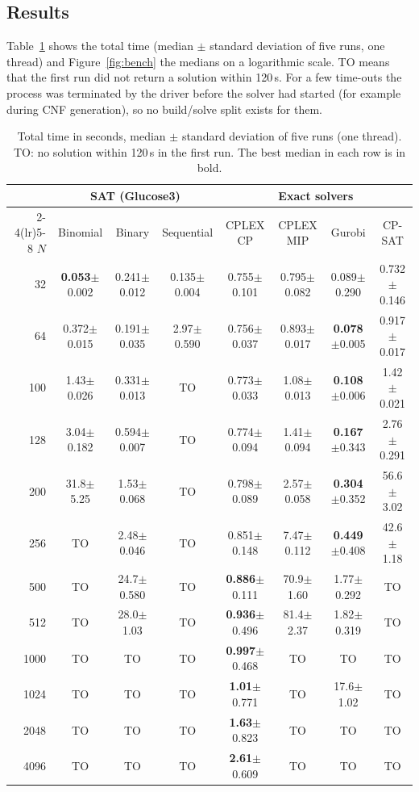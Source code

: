 \documentclass[a4paper,fleqn]{cas-sc}
\begin{document}
\subsection{Results}
Table~\ref{tab:results} shows the total time (median $\pm$ standard deviation of five runs, one thread) and Figure~\ref{fig:bench} the medians on a logarithmic scale.
\textsc{TO} means that the first run did not return a solution within 120\,s.
For a few time-outs the process was terminated by the driver before the solver had started (for example during CNF generation), so no build/solve split exists for them.

\begin{table}[htbp]
\centering
\caption{Total time in seconds, median $\pm$ standard deviation of five runs (one thread). \textsc{TO}: no solution within 120\,s in the first run. The best median in each row is in bold.}\label{tab:results}
\footnotesize
\setlength{\tabcolsep}{3.2pt}
\begin{tabular}{r ccc cccc}
\toprule
 & \multicolumn{3}{c}{SAT (Glucose3)} & \multicolumn{4}{c}{Exact solvers}\\
\cmidrule(lr){2-4}\cmidrule(lr){5-8}
$N$ & Binomial & Binary & Sequential & CPLEX CP & CPLEX MIP & Gurobi & CP-SAT\\
\midrule
32 & \textbf{0.053}$\pm$0.002 & 0.241$\pm$0.012 & 0.135$\pm$0.004 & 0.755$\pm$0.101 & 0.795$\pm$0.082 & 0.089$\pm$0.290 & 0.732$\pm$0.146\\
64 & 0.372$\pm$0.015 & 0.191$\pm$0.035 & 2.97$\pm$0.590 & 0.756$\pm$0.037 & 0.893$\pm$0.017 & \textbf{0.078}$\pm$0.005 & 0.917$\pm$0.017\\
100 & 1.43$\pm$0.026 & 0.331$\pm$0.013 & TO & 0.773$\pm$0.033 & 1.08$\pm$0.013 & \textbf{0.108}$\pm$0.006 & 1.42$\pm$0.021\\
128 & 3.04$\pm$0.182 & 0.594$\pm$0.007 & TO & 0.774$\pm$0.094 & 1.41$\pm$0.094 & \textbf{0.167}$\pm$0.343 & 2.76$\pm$0.291\\
200 & 31.8$\pm$5.25 & 1.53$\pm$0.068 & TO & 0.798$\pm$0.089 & 2.57$\pm$0.058 & \textbf{0.304}$\pm$0.352 & 56.6$\pm$3.02\\
256 & TO & 2.48$\pm$0.046 & TO & 0.851$\pm$0.148 & 7.47$\pm$0.112 & \textbf{0.449}$\pm$0.408 & 42.6$\pm$1.18\\
500 & TO & 24.7$\pm$0.580 & TO & \textbf{0.886}$\pm$0.111 & 70.9$\pm$1.60 & 1.77$\pm$0.292 & TO\\
512 & TO & 28.0$\pm$1.03 & TO & \textbf{0.936}$\pm$0.496 & 81.4$\pm$2.37 & 1.82$\pm$0.319 & TO\\
1000 & TO & TO & TO & \textbf{0.997}$\pm$0.468 & TO & TO & TO\\
1024 & TO & TO & TO & \textbf{1.01}$\pm$0.771 & TO & 17.6$\pm$1.02 & TO\\
2048 & TO & TO & TO & \textbf{1.63}$\pm$0.823 & TO & TO & TO\\
4096 & TO & TO & TO & \textbf{2.61}$\pm$0.609 & TO & TO & TO\\
\bottomrule
\end{tabular}
\end{table}
\end{document}
